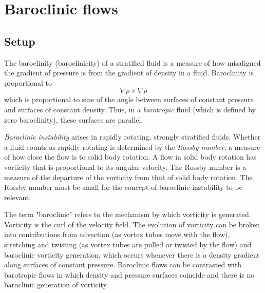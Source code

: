 
\chapter{Baroclinic flows}
\label{chap:baroclinic}

\section{Setup}
\label{s:review}

The baroclinity (baroclinicity) of a stratified fluid is a measure of how
misaligned the gradient of pressure is from the gradient of density in a
fluid. Baroclinity is proportional to
\[
    \nabla p \times \nabla \rho
\]
which is proportional to sine of the angle between surfaces of constant
pressure and surfaces of constant density. Thus, in a \emph{barotropic} fluid
(which is defined by zero baroclinity), these surfaces are parallel.

\emph{Baroclinic instability} arises in rapidly rotating, strongly
stratified fluids. Whether a fluid counts as rapidly rotating is
determined by the \emph{Rossby number}, a measure of how close the flow
is to solid body rotation. A flow in solid body rotation has vorticity
that is proportional to its angular velocity. The Rossby number is a
measure of the departure of the vorticity from that of solid body
rotation. The Rossby number must be small for the concept of baroclinic
instability to be relevant.

The term "baroclinic" refers to the mechanism by which vorticity is
generated. Vorticity is the curl of the velocity field. The
evolution of vorticity can be broken into contributions from advection
(as vortex tubes move with the flow), stretching and twisting (as vortex
tubes are pulled or twisted by the flow) and baroclinic vorticity
generation, which occurs whenever there is a density gradient along
surfaces of constant pressure. Baroclinic flows can be contrasted with
barotropic flows in which density and pressure surfaces coincide and
there is no baroclinic generation of vorticity.


